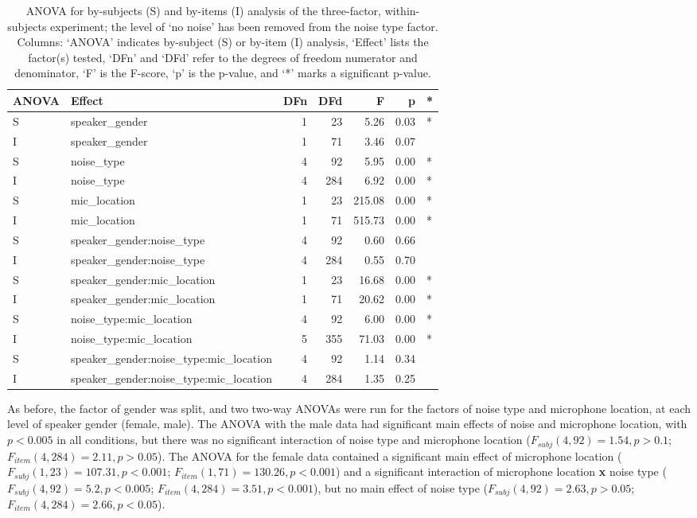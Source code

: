 \begin{table}[ht]
\centering
\begin{tabular}{llrrrrl}
  \hline
ANOVA & Effect & DFn & DFd & F & p & * \\ 
  \hline
S & speaker\_gender & 1 & 23 & 5.26 & 0.03 & * \\ 
  I & speaker\_gender & 1 & 71 & 3.46 & 0.07 &  \\ 
  S & noise\_type & 4 & 92 & 5.95 & 0.00 & * \\ 
  I & noise\_type & 4 & 284 & 6.92 & 0.00 & * \\ 
  S & mic\_location & 1 & 23 & 215.08 & 0.00 & * \\ 
  I & mic\_location & 1 & 71 & 515.73 & 0.00 & * \\ 
  S & speaker\_gender:noise\_type & 4 & 92 & 0.60 & 0.66 &  \\ 
  I & speaker\_gender:noise\_type & 4 & 284 & 0.55 & 0.70 &  \\ 
  S & speaker\_gender:mic\_location & 1 & 23 & 16.68 & 0.00 & * \\ 
  I & speaker\_gender:mic\_location & 1 & 71 & 20.62 & 0.00 & * \\ 
  S & noise\_type:mic\_location & 4 & 92 & 6.00 & 0.00 & * \\ 
  I & noise\_type:mic\_location & 5 & 355 & 71.03 & 0.00 & * \\ 
  S & speaker\_gender:noise\_type:mic\_location & 4 & 92 & 1.14 & 0.34 &  \\ 
  I & speaker\_gender:noise\_type:mic\_location & 4 & 284 & 1.35 & 0.25 &  \\ 
   \hline
\end{tabular}
\caption{ANOVA for by-subjects (S) and by-items (I) analysis of the three-factor, within-subjects experiment; the level of `no noise' has been removed from the noise type factor. Columns: `ANOVA' indicates by-subject (S) or by-item (I) analysis, `Effect' lists the factor(s) tested, `DFn' and `DFd' refer to the degrees of freedom numerator and denominator, `F' is the F-score, `p' is the p-value, and `*' marks a significant p-value.} 
\label{tab:anova2}
\end{table}


As before, the factor of gender was split, and two two-way ANOVAs were run for the factors of noise type and microphone location, at each level of speaker gender (female, male).  The ANOVA with the male data had significant main effects of noise and microphone location, with $p<0.005$ in all conditions, but there was no significant interaction of noise type and microphone location ($F_{subj}(4,92)=1.54, p>0.1$; $F_{item}(4,284)=2.11, p>0.05$).  The ANOVA for the female data contained a significant main effect of microphone location ($F_{subj}(1,23)=107.31, p<0.001$; $F_{item}(1,71)=130.26, p<0.001$) and a significant interaction of microphone location \textbf{x} noise type ($F_{subj}(4,92)=5.2, p<0.005$; $F_{item}(4,284)=3.51, p<0.001$), but no main effect of noise type ($F_{subj}(4,92)=2.63, p>0.05$; $F_{item}(4,284)=2.66, p<0.05$).


